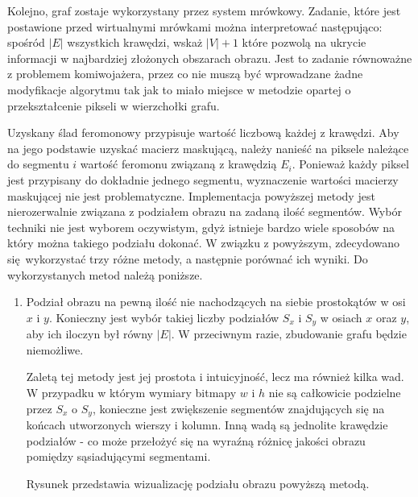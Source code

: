 {{{            Kolejno, graf zostaje wykorzystany przez system mrówkowy. Zadanie, które jest postawione przed wirtualnymi
            mrówkami można interpretować następująco: spośród $|E|$ wszystkich krawędzi, wskaż $|V| + 1$ które pozwolą
            na ukrycie informacji w najbardziej złożonych obszarach obrazu. Jest to zadanie równoważne z problemem
            komiwojażera, przez co nie muszą być wprowadzane żadne modyfikacje algorytmu tak jak to miało miejsce w
            metodzie opartej o przekształcenie pikseli w wierzchołki grafu.

            Uzyskany ślad feromonowy przypisuje wartość liczbową każdej z krawędzi. Aby na jego podstawie uzyskać
            macierz maskującą, należy nanieść na piksele należące do segmentu $i$ wartość feromonu związaną z krawędzią
            $E_i$. Ponieważ każdy piksel jest przypisany do dokładnie jednego segmentu, wyznaczenie wartości macierzy
            maskującej nie jest problematyczne.
            Implementacja powyższej metody jest nierozerwalnie związana z podziałem obrazu na zadaną ilość segmentów.
            Wybór techniki nie jest wyborem oczywistym, gdyż istnieje bardzo wiele sposobów na który można takiego
            podziału dokonać. W związku z powyższym, zdecydowano się wykorzystać trzy różne metody, a następnie porównać
            ich wyniki. Do wykorzystanych metod należą poniższe.

            \begin{enumerate}
                \item Podział obrazu na pewną ilość nie nachodzących na siebie prostokątów w osi $x$ i $y$. Konieczny
                jest wybór takiej liczby podziałów $S_x$ i $S_y$ w osiach $x$ oraz $y$, aby ich iloczyn był równy $|E|$.
                W przeciwnym razie, zbudowanie grafu będzie niemożliwe.

                Zaletą tej metody jest jej prostota i intuicyjność, lecz ma również kilka wad. W przypadku w którym
                wymiary bitmapy $w$ i $h$ nie są całkowicie podzielne przez $S_x$ o $S_y$, konieczne jest zwiększenie
                segmentów znajdujących się na końcach utworzonych wierszy i kolumn. Inną wadą są jednolite krawędzie
                podziałów - co może przełożyć się na wyraźną różnicę jakości obrazu pomiędzy sąsiadującymi segmentami.

                Rysunek przedstawia wizualizację podziału obrazu powyższą metodą.


\end{enumerate}}}}
